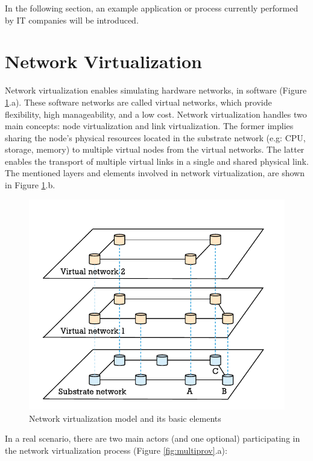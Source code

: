 In the following section, an example application or process currently performed by IT companies will be introduced.


\section{Network Virtualization}

Network virtualization enables simulating hardware networks, in software (Figure \ref{fig:networkvir}.a). These software networks are called virtual networks, which provide flexibility, high manageability, and a low cost. Network virtualization handles two main concepts: node virtualization and link virtualization. The former implies sharing the node's physical resources located in the substrate network (e.g: CPU, storage, memory) to multiple virtual nodes from the virtual networks. The latter enables the transport of multiple virtual links in a single and shared physical link. The mentioned layers and elements involved in network virtualization, are shown in Figure \ref{fig:networkvir}.b.


\begin{figure}[bth]
  \includegraphics[width=1\linewidth]{gfx/networkvir}    
  \caption{Network virtualization model and its basic elements \citep{carapinha2009network}}
  \label{fig:networkvir}
\end{figure}

In a real scenario, there are two main actors (and one optional) participating in the network virtualization process (Figure \ref{fig:multiprov}.a): 

